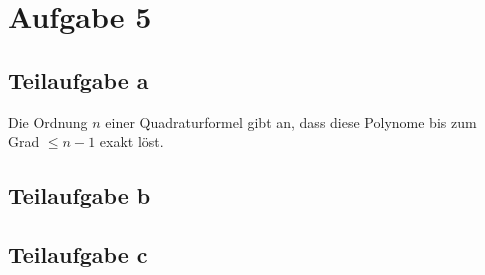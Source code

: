 \section*{Aufgabe 5}
\subsection*{Teilaufgabe a}
Die Ordnung $n$ einer Quadraturformel gibt an, dass diese Polynome
bis zum Grad $\leq n - 1$ exakt löst.

\subsection*{Teilaufgabe b}
\subsection*{Teilaufgabe c}
